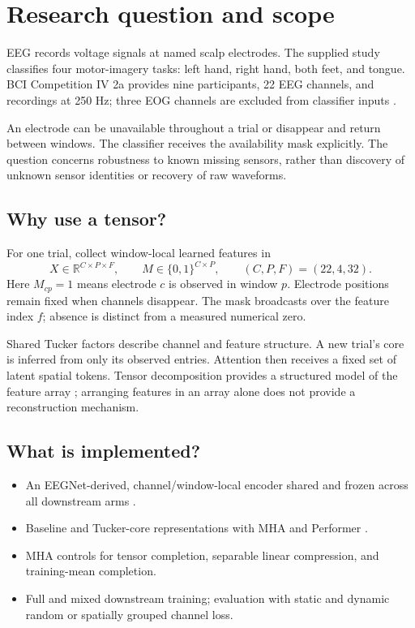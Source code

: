 \documentclass[11pt,a4paper]{article}
\newcommand{\R}{\mathbb{R}}
\begin{document}
\section{Research question and scope}
EEG records voltage signals at named scalp electrodes. The supplied study
classifies four motor-imagery tasks: left hand, right hand, both feet, and tongue.
BCI Competition IV 2a provides nine participants, 22 EEG channels, and recordings
at 250 Hz; three EOG channels are excluded from classifier inputs \cite{bci}.

An electrode can be unavailable throughout a trial or disappear and return
between windows. The classifier receives the availability mask explicitly.
The question concerns robustness to known missing sensors, rather than discovery
of unknown sensor identities or recovery of raw waveforms.

\subsection{Why use a tensor?}
For one trial, collect window-local learned features in
\begin{equation}
 X\in\R^{C\times P\times F},\qquad
 M\in\{0,1\}^{C\times P},\qquad (C,P,F)=(22,4,32).
\end{equation}
Here \(M_{cp}=1\) means electrode \(c\) is observed in window \(p\). Electrode
positions remain fixed when channels disappear. The mask broadcasts over the
feature index \(f\); absence is distinct from a measured numerical zero.

Shared Tucker factors describe channel and feature structure. A new trial's
core is inferred from only its observed entries. Attention then receives a
fixed set of latent spatial tokens. Tensor decomposition provides a structured
model of the feature array \cite{tucker}; arranging features in an array alone
does not provide a reconstruction mechanism.

\subsection{What is implemented?}
\begin{itemize}
\item An EEGNet-derived, channel/window-local encoder shared and frozen across
      all downstream arms \cite{eegnet}.
\item Baseline and Tucker-core representations with MHA and Performer
      \cite{attention,performer}.
\item MHA controls for tensor completion, separable linear compression, and
      training-mean completion.
\item Full and mixed downstream training; evaluation with static and dynamic
      random or spatially grouped channel loss.
\end{itemize}
\end{document}
